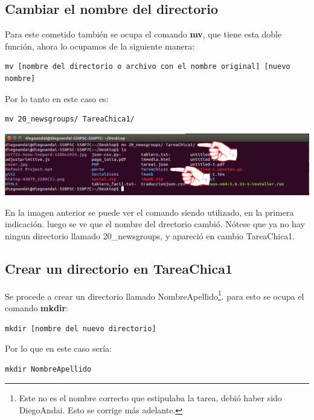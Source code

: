 \documentclass[a4paper,11pt]{article}
\theoremstyle{mytheor}
\begin{document}
\subsection{Cambiar el nombre del directorio}

Para este cometido también se ocupa el comando \textbf{mv}, que tiene esta doble función, ahora lo ocupamos de la siguiente manera:

\begin{lstlisting}
mv [nombre del directorio o archivo con el nombre original] [nuevo nombre]
\end{lstlisting}

Por lo tanto en este caso es:

\begin{lstlisting}
mv 20_newsgroups/ TareaChica1/
\end{lstlisting}

\begin{center}
\includegraphics[scale=0.41]{tc_paso3.png}
\end{center}

En la imagen anterior se puede ver el comando siendo utilizado, en la primera indicación. luego se ve que el nombre del drectorio cambió. Nótese que ya no hay ningun directorio llamado 20\_newsgroups, y apareció en cambio TareaChica1.

\subsection{Crear un directorio en TareaChica1}

Se procede a crear un directorio llamado NombreApellido\footnote{Este no es el nombre correcto que estipulaba la tarea, debió haber sido DiegoAndai. Esto se corrige más adelante.}. para esto se ocupa el comando \textbf{mkdir}:

\begin{lstlisting}
mkdir [nombre del nuevo directorio]
\end{lstlisting}

Por lo que en este caso sería:

\begin{lstlisting}
mkdir NombreApellido
\end{lstlisting}
\end{document}
